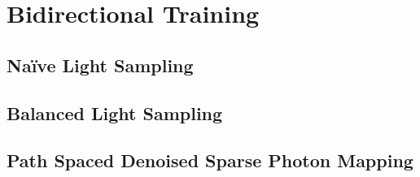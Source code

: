 
\chapter{Bidirectional Training}
\label{chap:bidirectional_training}

\section{Na\"ive Light Sampling}

\section{Balanced Light Sampling}

\section{Path Spaced Denoised Sparse Photon Mapping}